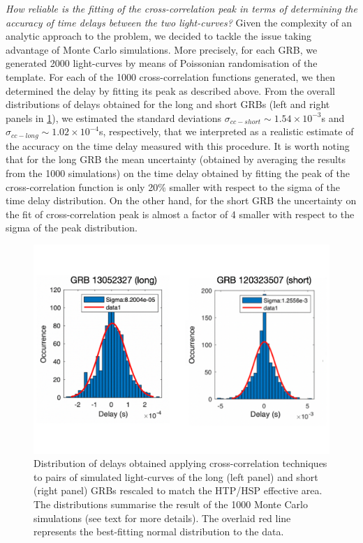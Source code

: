 \documentclass[]{spie}  %
\begin{document}
\emph{How reliable is the fitting of the cross-correlation peak in terms of determining the accuracy of time delays between the two light-curves?} Given the complexity of an analytic approach to the problem, we decided to tackle the issue taking advantage of Monte Carlo simulations. More precisely, for each GRB, we generated 2000 light-curves by means of Poissonian randomisation of the template. For each of the 1000 cross-correlation functions generated, we then determined the delay by fitting its peak as described above. From the overall distributions of delays obtained for the long and short GRBs (left and right panels in \ref{fig:xc_sigma}), we estimated the standard deviations $\sigma_{cc-short}\sim1.54\times10^{-3}$s and $\sigma_{cc-long}\sim 1.02\times10^{-4}$s, respectively, that we interpreted as a realistic estimate of the accuracy on the time delay measured with this procedure. It is worth noting that for the long GRB the mean uncertainty (obtained by averaging the results from the 1000 simulations) on the time delay obtained by fitting the peak of the cross-correlation function is only 20\% smaller with respect to the sigma of the time delay distribution. On the other hand, for the short GRB the uncertainty on the fit of cross-correlation peak is almost a factor of 4 smaller with respect to the sigma of the peak distribution.


\begin{figure}[h!]
\centering
\includegraphics[scale=0.45,angle=0]{sigma_cc_sim}
\vspace{-1cm}
\caption{Distribution of delays obtained applying cross-correlation techniques to pairs of simulated light-curves of the long (left panel) and short (right panel) GRBs rescaled to match the HTP/HSP effective area. The distributions summarise the result of the 1000 Monte Carlo simulations (see text for more details). The overlaid red line represents the best-fitting normal distribution to the data.} 
\label{fig:xc_sigma}
\end{figure}
\end{document}
